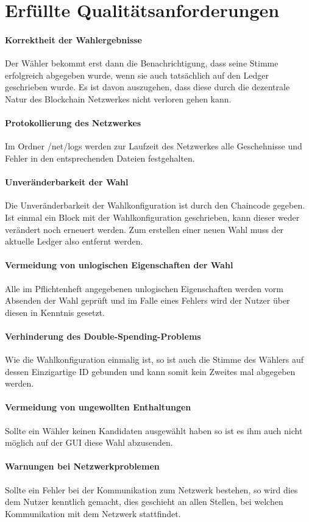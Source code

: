 \documentclass[parskip=full]{scrartcl}
\begin{document}
\section{Erfüllte Qualitätsanforderungen}
\paragraph{Korrektheit der Wahlergebnisse}
Der Wähler bekommt erst dann die Benachrichtigung, dass seine Stimme erfolgreich abgegeben wurde, wenn sie auch tatsächlich auf den Ledger geschrieben wurde. Es ist davon auszugehen, dass diese durch die dezentrale Natur des Blockchain Netzwerkes nicht verloren gehen kann.
\paragraph{Protokollierung des Netzwerkes}
Im Ordner /net/logs werden zur Laufzeit des Netzwerkes alle Geschehnisse und Fehler in den entsprechenden Dateien festgehalten.
\paragraph{Unveränderbarkeit der Wahl}
Die Unveränderbarkeit der Wahlkonfiguration ist durch den Chaincode gegeben. Ist einmal ein Block mit der Wahlkonfiguration geschrieben, kann dieser weder verändert noch erneuert werden. Zum erstellen einer neuen Wahl muss der aktuelle Ledger also entfernt werden.
\paragraph{Vermeidung von unlogischen Eigenschaften der Wahl}
Alle im Pflichtenheft angegebenen unlogischen Eigenschaften werden vorm Absenden der Wahl geprüft und im Falle eines Fehlers wird der Nutzer über diesen in Kenntnis gesetzt.
\paragraph{Verhinderung des Double-Spending-Problems}
Wie die Wahlkonfiguration einmalig ist, so ist auch die Stimme des Wählers auf dessen Einzigartige ID gebunden und kann somit kein Zweites mal abgegeben werden.
\paragraph{Vermeidung von ungewollten Enthaltungen}
Sollte ein Wähler keinen Kandidaten ausgewählt haben so ist es ihm auch nicht möglich auf der GUI diese Wahl abzusenden.
\paragraph{Warnungen bei Netzwerkproblemen}
Sollte ein Fehler bei der Kommunikation zum Netzwerk bestehen, so wird dies dem Nutzer kenntlich gemacht, dies geschieht an allen Stellen, bei welchen Kommunikation mit dem Netzwerk stattfindet.
\end{document}
